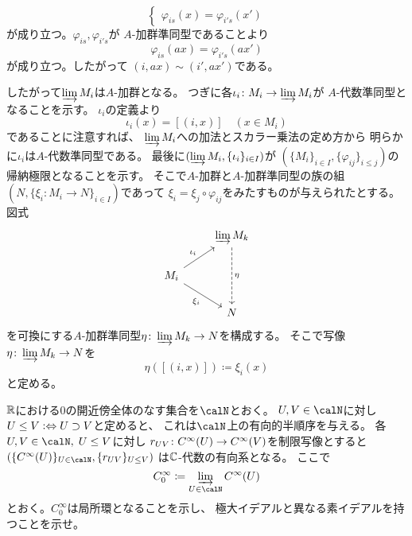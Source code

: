 \documentclass[report]{jlreq}
\begin{document}
\begin{answer}
\begin{innerproof}
\begin{equation}
\begin{cases}
                \varphi_{is}(x) = \varphi_{i's}(x')
            \end{cases}
        \end{equation}
        が成り立つ。$\varphi_{is}, \varphi_{i's}$が
        $A$-加群準同型であることより
        \begin{equation}
            \varphi_{is}(ax) = \varphi_{i's}(ax')
        \end{equation}
        が成り立つ。したがって
        $(i, ax) \sim (i', ax')$である。
    \end{innerproof}
    したがって$\varinjlim M_i$は$A$-加群となる。
    つぎに各$\iota_i \colon M_i \to \varinjlim M_i$が
    $A$-代数準同型となることを示す。
    $\iota_i$の定義より
    \begin{equation}
        \iota_i(x) = [(i, x)]
        \quad (x \in M_i)
    \end{equation}
    であることに注意すれば、
    $\varinjlim M_i$への加法とスカラー乗法の定め方から
    明らかに$\iota_i$は$A$-代数準同型である。
    最後に$(\varinjlim M_i, \{ \iota_i \}_{i \in I})$が
    $(\{ M_i \}_{i \in I}, \{ \varphi_{ij} \}_{i \le j})$の
    帰納極限となることを示す。
    そこで$A$-加群と$A$-加群準同型の族の組
    $(N, \{ \xi_i \colon M_i \to N \}_{i \in I})$であって
    $\xi_i = \xi_j \circ \varphi_{ij}$をみたすものが与えられたとする。
    図式
    \begin{equation}
        \begin{tikzcd}
            & \varinjlim M_k \ar[dashed]{dd}{\eta} \\
            M_i \ar{ru}{\iota_{i}} \ar{rd}[swap]{\xi_i} \\
            & N
        \end{tikzcd}
    \end{equation}
    を可換にする$A$-加群準同型$\eta \colon \varinjlim M_k \to N$を構成する。
    そこで写像$\eta \colon \varinjlim M_k \to N$を
    \begin{equation}
        \eta([(i, x)]) \coloneqq \xi_i(x)
    \end{equation}
    と定める。
    \TODO{}
\end{answer}

\begin{problem}[代数学7.96]
    $\mathbb{R}$における$0$の開近傍全体のなす集合を$\calN$とおく。
    $U, V \in \calN$に対し
    $U \le V \vcentcolon\Leftrightarrow U \supset V$と定めると、
    これは$\calN$上の有向的半順序を与える。
    各$U, V \in \calN, \; U \le V$に対し
    $r_{UV} \colon C^\infty(U) \to C^\infty(V)$を制限写像とすると
    $(\{ \smooth(U) \}_{U \in \calN}, \{ r_{UV} \}_{U \le V})$
    は$\mathbb{C}$-代数の有向系となる。
    ここで
    \begin{equation}
        C_0^\infty \coloneqq \varinjlim_{U \in \calN} \smooth(U)
    \end{equation}
    とおく。$C_0^\infty$は局所環となることを示し、
    極大イデアルと異なる素イデアルを持つことを示せ。
\end{problem}
\end{document}
